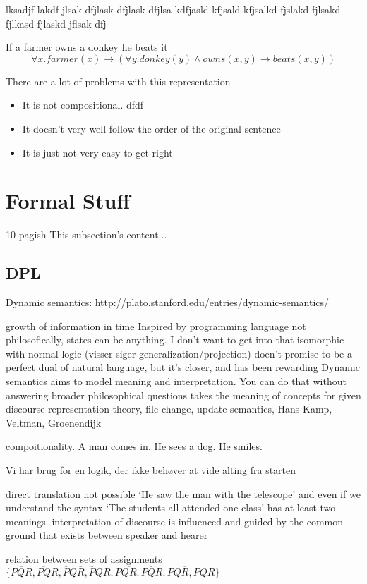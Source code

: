 \documentclass[12pt]{article}
\let\stdsection\section
\renewcommand\section{\newpage\stdsection}
\begin{document}
lksadjf lakdf jlsak dfjlask dfjlask dfjlsa kdfjasld kfjsald kfjsalkd fjslakd fjlsakd fjlkasd fjlaskd jflsak dfj

If a farmer owns a donkey he beats it
\begin{equation}
\forall x . farmer(x) \rightarrow (\forall y . donkey(y) \wedge owns(x,y) \rightarrow beats(x,y))
\end{equation}

There are a lot of problems with this representation
\begin{itemize}
  \item It is not compositional. 
  dfdf
  \item It doesn't very well follow the order of the original sentence
  \item It is just not very easy to get right
\end{itemize}

\section{Formal Stuff}
10 pagish
This subsection's content...
\subsection{DPL}
Dynamic semantics: http://plato.stanford.edu/entries/dynamic-semantics/

growth of information in time
Inspired by programming language
not philosofically, states can be anything. I don't want to get into that
isomorphic with normal logic (visser siger generalization/projection)
doen't promise to be a perfect dual of natural language, but it's closer, and has been rewarding
Dynamic semantics aims to model meaning and interpretation. You can do that without answering broader philosophical questions
takes the meaning of concepts for given
discourse representation theory, file change, update semantics, 
Hans Kamp, Veltman, Groenendijk

compoitionality. A man comes in. He sees a dog. He smiles.

Vi har brug for en logik, der ikke behøver at vide alting fra starten

direct translation not possible
`He saw the man with the telescope'
and even if we understand the syntax
`The students all attended one class'
has at least two meanings.
interpretation of discourse is influenced and guided by the common ground that exists between speaker and hearer

relation between sets of assignments
$\{\overline{PQR}, \overline{PQ}R, \overline{P}Q\overline{R}, \overline{P}QR, P\overline{QR}, P\overline{Q}R, PQ\overline{R}, PQR\}$
\end{document}
